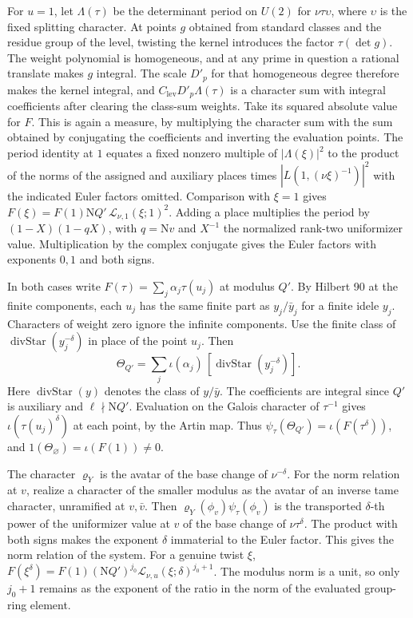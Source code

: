 For \(u=1\), let \(\Lambda(\tau)\) be the determinant period on \(U(2)\) for
\(\nu\tau\upsilon\), where \(\upsilon\) is the fixed splitting character.
At points \(g\) obtained from standard classes and the residue group of the level,
twisting the kernel introduces the factor \(\tau(\det g)\).
The weight polynomial is homogeneous, and at any prime in question a rational translate
makes \(g\) integral. The scale \(D'_p\) for that homogeneous degree therefore makes the
kernel integral, and \(C_{\mathrm{lev}}D'_p\Lambda(\tau)\) is a character sum with integral
coefficients after clearing the class-sum weights.
Take its squared absolute value for \(F\). This is again a measure, by multiplying the
character sum with the sum obtained by conjugating the coefficients and inverting the
evaluation points. The period identity at \(1\) equates a fixed nonzero multiple of
\(|\Lambda(\xi)|^2\) to the product of the norms of the assigned and auxiliary places
times \(|L(1,(\nu\xi)^{-1})|^2\) with the indicated Euler factors omitted.
Comparison with \(\xi=1\) gives \(F(\xi)=F(1)\mathrm NQ'\,\mathcal L_{\nu,1}(\xi;1)^2\).
Adding a place multiplies the period by \((1-X)(1-qX)\), with \(q=\mathrm Nv\) and \(X^{-1}\)
the normalized rank-two uniformizer value. Multiplication by the complex conjugate gives the
Euler factors with exponents \(0,1\) and both signs.

In both cases write \(F(\tau)=\sum_j\alpha_j\tau(u_j)\) at modulus \(Q'\).
By Hilbert 90 at the finite components, each \(u_j\) has the same finite part as
\(y_j/\bar y_j\) for a finite idele \(y_j\). Characters of weight zero ignore the infinite components.
Use the finite class of \(\operatorname{divStar}(y_j^{-\delta})\) in place of the point \(u_j\).
Then
\[
 \Theta_{Q'}=\sum_j\iota(\alpha_j)\,[\operatorname{divStar}(y_j^{-\delta})].
\]
Here \(\operatorname{divStar}(y)\) denotes the class of \(y/\bar y\).
The coefficients are integral since \(Q'\) is auxiliary and \(\ell\nmid\mathrm NQ'\).
Evaluation on the Galois character of \(\tau^{-1}\) gives
\(\iota(\tau(u_j)^\delta)\) at each point, by the Artin map.
Thus \(\psi_\tau(\Theta_{Q'})=\iota(F(\tau^\delta))\), and
\(1(\Theta_\varnothing)=\iota(F(1))\ne0\).

The character \(\varrho_Y\) is the avatar of the base change of \(\nu^{-\delta}\).
For the norm relation at \(v\), realize a character of the smaller modulus as the avatar of an
inverse tame character, unramified at \(v,\bar v\).
Then \(\varrho_Y(\phi_v)\psi_\tau(\phi_v)\) is the transported \(\delta\)-th power of the
uniformizer value at \(v\) of the base change of \(\nu\tau^\delta\).
The product with both signs makes the exponent \(\delta\) immaterial to the Euler factor.
This gives the norm relation of the system. For a genuine twist \(\xi\),
\(F(\xi^\delta)=F(1)(\mathrm NQ')^{j_0}\mathcal L_{\nu,u}(\xi;\delta)^{j_0+1}\).
The modulus norm is a unit, so only \(j_0+1\) remains as the exponent of the ratio
in the norm of the evaluated group-ring element.

